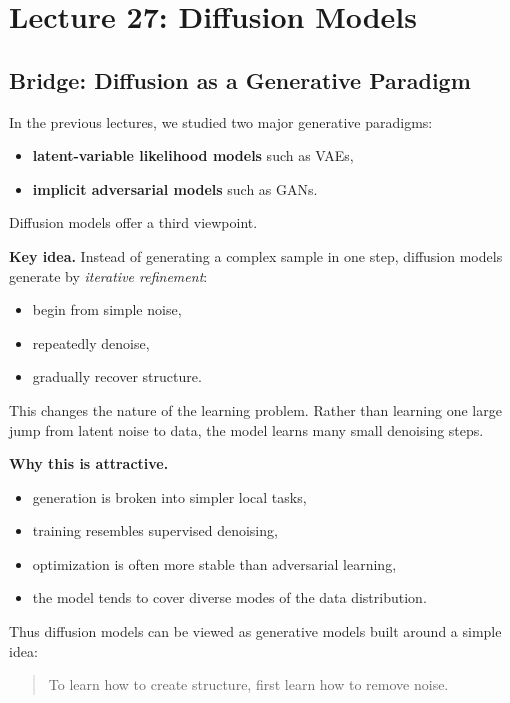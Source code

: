 \section{Lecture 27: Diffusion Models}

\subsection{Bridge: Diffusion as a Generative Paradigm}

In the previous lectures, we studied two major generative paradigms:

\begin{itemize}
    \item \textbf{latent-variable likelihood models} such as VAEs,
    \item \textbf{implicit adversarial models} such as GANs.
\end{itemize}

Diffusion models offer a third viewpoint.

\medskip

\noindent
\textbf{Key idea.}  
Instead of generating a complex sample in one step, diffusion models generate by \emph{iterative refinement}:
\begin{itemize}
    \item begin from simple noise,
    \item repeatedly denoise,
    \item gradually recover structure.
\end{itemize}

\medskip

\noindent
This changes the nature of the learning problem. Rather than learning one large jump from latent noise to data, the model learns many small denoising steps.

\medskip

\noindent
\textbf{Why this is attractive.}
\begin{itemize}
    \item generation is broken into simpler local tasks,
    \item training resembles supervised denoising,
    \item optimization is often more stable than adversarial learning,
    \item the model tends to cover diverse modes of the data distribution.
\end{itemize}

\medskip

\noindent
Thus diffusion models can be viewed as generative models built around a simple idea:
\begin{quote}
To learn how to create structure, first learn how to remove noise.
\end{quote}

